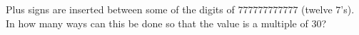 Plus signs are inserted between some of the digits of $777777777777$ (twelve $7$'s). In how many ways can this be done so that the value is a multiple of $30$?
